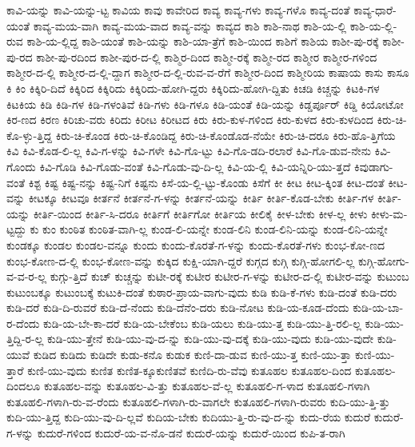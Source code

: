 {ಕಾವಿ-ಯನ್ನು
ಕಾವಿ-ಯನ್ನು-ಟ್ಟ
ಕಾವಿಯ
ಕಾವು
ಕಾವೇರಿದ
ಕಾವ್ಯ
ಕಾವ್ಯ-ಗಳು
ಕಾವ್ಯ-ಗಳೊ
ಕಾವ್ಯ-ದಂತೆ
ಕಾವ್ಯ-ಧಾರೆ-ಯಂತೆ
ಕಾವ್ಯ-ಮಯ-ವಾಗಿ
ಕಾವ್ಯ-ಮಯ-ವಾದ
ಕಾವ್ಯ-ವನ್ನು
ಕಾವ್ಯದ
ಕಾಶಿ
ಕಾಶಿ-ನಾಥ
ಕಾಶಿ-ಯ-ಲ್ಲಿ
ಕಾಶಿ-ಯ-ಲ್ಲಿ-ರುವ
ಕಾಶಿ-ಯ-ಲ್ಲಿದ್ದ
ಕಾಶಿ-ಯಂತೆ
ಕಾಶಿ-ಯನ್ನು
ಕಾಶಿ-ಯಾ-ತ್ರೆಗೆ
ಕಾಶಿ-ಯಿಂದ
ಕಾಶಿಗೆ
ಕಾಶಿಯ
ಕಾಶೀ-ಪು-ರಕ್ಕೆ
ಕಾಶೀ-ಪು-ರದ
ಕಾಶೀ-ಪು-ರದಿಂದ
ಕಾಶೀ-ಪುರ-ದ-ಲ್ಲಿ
ಕಾಶ್ಮಿರ-ದಿಂದ
ಕಾಶ್ಮೀ-ರಕ್ಕೆ
ಕಾಶ್ಮೀ-ರದ
ಕಾಶ್ಮೀರ
ಕಾಶ್ಮೀರ-ಗಳಿಂದ
ಕಾಶ್ಮೀರ-ದ-ಲ್ಲಿ
ಕಾಶ್ಮೀರ-ದ-ಲ್ಲಿ-ದ್ದಾಗ
ಕಾಶ್ಮೀರ-ದ-ಲ್ಲಿ-ರುವ-ವ-ರೆಗೆ
ಕಾಶ್ಮೀರ-ದಿಂದ
ಕಾಶ್ಮೀರಿಯ
ಕಾಷಾಯ
ಕಾಸು
ಕಾಸೂ
ಕಿ
ಕಿಂ
ಕಿಕ್ಕಿರಿ-ದಿದೆ
ಕಿಕ್ಕಿರಿದ
ಕಿಕ್ಕಿರಿದು
ಕಿಕ್ಕಿರಿದು-ಹೋಗಿ-ದ್ದರು
ಕಿಕ್ಕಿರಿದು-ಹೋಗಿ-ದ್ದಿತು
ಕಿಚಡಿ
ಕಿಚ್ಚನ್ನು
ಕಿಟಕಿ-ಗಳ
ಕಿಟಕಿಯ
ಕಿಡಿ
ಕಿಡಿ-ಗಳ
ಕಿಡಿ-ಗಳಂತಿವೆ
ಕಿಡಿ-ಗಳು
ಕಿಡಿ-ಗಳೂ
ಕಿಡಿ-ಯಂತೆ
ಕಿಡಿ-ಯನ್ನು
ಕಿಡ್ಡರ್ಪೂರ್
ಕಿಡ್ಡಿ
ಕಿಯೋಟೋ
ಕಿರ-ಣದ
ಕಿರಣ
ಕಿರಿಚು-ವರು
ಕಿರಿದು
ಕಿರೀಟ
ಕಿರೀಟದ
ಕಿರು
ಕಿರು-ಕುಳ-ಗಳಿಂದ
ಕಿರು-ಕುಳದ
ಕಿರು-ಕುಳದಿಂದ
ಕಿರು-ಚಿ-ಕೊ-ಳ್ಳು-ತ್ತಿದ್ದ
ಕಿರು-ಚಿ-ಕೊಂಡ
ಕಿರು-ಚಿ-ಕೊಂಡಿದ್ದ
ಕಿರು-ಚಿ-ಕೊಂಡೊಡ-ನೆಯೇ
ಕಿರು-ಚಿ-ದರೂ
ಕಿರು-ಹೊ-ತ್ತಿಗೆಯ
ಕಿವಿ
ಕಿವಿ-ಕೊಡ-ಲಿ-ಲ್ಲ
ಕಿವಿ-ಗ-ಳನ್ನು
ಕಿವಿ-ಗಳೇ
ಕಿವಿ-ಗೊ-ಟ್ಟು
ಕಿವಿ-ಗೊ-ಡದಿ-ರಲಾರೆ
ಕಿವಿ-ಗೊ-ಡುವ-ನೇನು
ಕಿವಿ-ಗೊಂದು
ಕಿವಿ-ಗೊಡಿ
ಕಿವಿ-ಗೊಡು-ವಂತೆ
ಕಿವಿ-ಗೊಡು-ವು-ದಿ-ಲ್ಲ
ಕಿವಿ-ಯ-ಲ್ಲಿ
ಕಿವಿ-ಯನ್ನಿರಿ-ಯು-ತ್ತದೆ
ಕಿವುಡಾಗು-ವಂತೆ
ಕಿಶ್ಟ
ಕಿಷ್ಟ
ಕಿಷ್ಟ-ನನ್ನು
ಕಿಷ್ಟ-ನಿಗೆ
ಕಿಷ್ಟನು
ಕಿಸೆ-ಯ-ಲ್ಲಿ-ಟ್ಟು-ಕೊಂಡು
ಕಿಸೆಗೆ
ಕೀ
ಕೀಟ
ಕೀಟ-ಕ್ಕಿಂತ
ಕೀಟ-ದಂತೆ
ಕೀಟ-ವನ್ನು
ಕೀಟಕ್ಕೂ
ಕೀಟವೂ
ಕೀರ್ತನೆ
ಕೀರ್ತನೆ-ಗ-ಳನ್ನು
ಕೀರ್ತನೆ-ಯನ್ನು
ಕೀರ್ತಿ
ಕೀರ್ತಿ-ಕೊಡ-ಬೇಕು
ಕೀರ್ತಿ-ಗಳ
ಕೀರ್ತಿ-ಯನ್ನು
ಕೀರ್ತಿ-ಯಿಂದ
ಕೀರ್ತಿ-ಸಿ-ದರೂ
ಕೀರ್ತಿಗೆ
ಕೀರ್ತಿಗೋ
ಕೀರ್ತಿಯ
ಕೀಲಿಕೈ
ಕೀಳ-ಬೇಕು
ಕೀಳ-ಲ್ಲ
ಕೀಳು
ಕೀಳು-ಮ-ಟ್ಟದ್ದು
ಕು
ಕುಂ
ಕುಂಠಿತ
ಕುಂಠಿತ-ವಾಗಿ-ಲ್ಲ
ಕುಂಡ-ಲಿ-ಯನ್ನೇ
ಕುಂಡ-ಲಿನಿ
ಕುಂಡ-ಲಿನಿ-ಯನ್ನು
ಕುಂಡ-ಲಿನಿ-ಯನ್ನೇ
ಕುಂಡಕ್ಕೂ
ಕುಂಡಲ
ಕುಂಡಲ-ವನ್ನೂ
ಕುಂದು
ಕುಂದು-ಕೊರತೆ-ಗ-ಳನ್ನು
ಕುಂದು-ಕೊರತೆ-ಗಳು
ಕುಂಭ-ಕೋ-ಣದ
ಕುಂಭ-ಕೋಣ-ದ-ಲ್ಲಿ
ಕುಂಭ-ಕೋಣ-ವನ್ನು
ಕುಕ್ಕಿದ
ಕುಕ್ಷಿ-ಯಾಗಿ-ದ್ದರೆ
ಕುಗ್ಗದ
ಕುಗ್ಗಿ
ಕುಗ್ಗಿ-ಹೋಗಲಿ-ಲ್ಲ
ಕುಗ್ಗಿ-ಹೋಗು-ವ-ವ-ರ-ಲ್ಲ
ಕುಗ್ಗು-ತ್ತಿದೆ
ಕುಚ್
ಕುಚ್ಚನ್ನು
ಕುಟೀ-ರಕ್ಕೆ
ಕುಟೀರ
ಕುಟೀರ-ಗ-ಳನ್ನು
ಕುಟೀರ-ದ-ಲ್ಲಿ
ಕುಟೀರ-ವನ್ನು
ಕುಟುಂಬ
ಕುಟುಂಬಕ್ಕೂ
ಕುಟುಂಬಕ್ಕೆ
ಕುಟುಕಿ-ದಂತೆ
ಕುಠಾರ-ಪ್ರಾಯ-ವಾಗು-ವುದು
ಕುಡಿ
ಕುಡಿ-ಕೆ-ಗಳು
ಕುಡಿ-ದಂತೆ
ಕುಡಿ-ದರು
ಕುಡಿ-ದರೆ
ಕುಡಿ-ದಿ-ರುವರೆ
ಕುಡಿ-ದೆ-ನೆಂದು
ಕುಡಿ-ದೆನೆಂ-ದರು
ಕುಡಿ-ನೋಟ
ಕುಡಿ-ಯ-ಕೂಡ-ದೆಂದು
ಕುಡಿ-ಯ-ಬಾ-ರ-ದೆಂದು
ಕುಡಿ-ಯ-ಬೇ-ಕಾ-ದರೆ
ಕುಡಿ-ಯ-ಬೇಕೆಂಬ
ಕುಡಿ-ಯಲು
ಕುಡಿ-ಯು-ತ್ತ
ಕುಡಿ-ಯು-ತ್ತಿ-ರಲಿ-ಲ್ಲ
ಕುಡಿ-ಯು-ತ್ತಿದ್ದಿ-ರ-ಲ್ಲ
ಕುಡಿ-ಯು-ತ್ತೇನೆ
ಕುಡಿ-ಯು-ವು-ದ-ನ್ನು
ಕುಡಿ-ಯು-ವು-ದಕ್ಕೆ
ಕುಡಿ-ಯು-ವುದು
ಕುಡಿ-ಯು-ವುದೇ
ಕುಡಿ-ಯುವೆ
ಕುಡಿದ
ಕುಡಿದು
ಕುಡಿದೇ
ಕುಡು-ಕನೊ
ಕುಡುಕ
ಕುಣಿ-ದಾ-ಡುವ
ಕುಣಿ-ಯು-ತ್ತ
ಕುಣಿ-ಯು-ತ್ತಾ
ಕುಣಿ-ಯು-ತ್ತಾರೆ
ಕುಣಿ-ಯು-ವುದು
ಕುಣಿತ
ಕುಣಿತ-ಕ್ಕೂಕುಣಿತವೆ
ಕುಣಿದಿ-ರು-ವೆವು
ಕುತೂಹಲ
ಕುತೂಹಲ-ದಿಂದ
ಕುತೂಹಲ-ದಿಂದಲೂ
ಕುತೂಹಲ-ವನ್ನು
ಕುತೂಹಲ-ವಿ-ತ್ತು
ಕುತೂಹಲ-ವೆ-ಲ್ಲ
ಕುತೂಹಲಿ-ಗ-ಳಾದ
ಕುತೂಹಲಿ-ಗಳಾಗಿ
ಕುತೂಹಲಿ-ಗಳಾಗಿ-ರು-ವ-ರೆಂದು
ಕುತೂಹಲಿ-ಗಳಾಗಿ-ರು-ವಾಗಲೇ
ಕುತೂಹಲಿ-ಗಳಾಗಿ-ರುವರು
ಕುದಿ-ಯು-ತ್ತಿ-ತ್ತು
ಕುದಿ-ಯು-ತ್ತಿದ್ದ
ಕುದಿ-ಯು-ವು-ದಿ-ಲ್ಲವೆ
ಕುದಿಯ-ಬೇಕು
ಕುದಿಯು-ತ್ತಿ-ರು-ವು-ದ-ನ್ನು
ಕುದು-ರೆಯ
ಕುದುರೆ
ಕುದುರೆ-ಗ-ಳನ್ನು
ಕುದುರೆ-ಗಳಿಂದ
ಕುದುರೆ-ಯ-ವ-ನೊ-ಡನೆ
ಕುದುರೆ-ಯನ್ನು
ಕುದುರೆ-ಯಿಂದ
ಕುಪಿ-ತ-ರಾಗಿ
}
